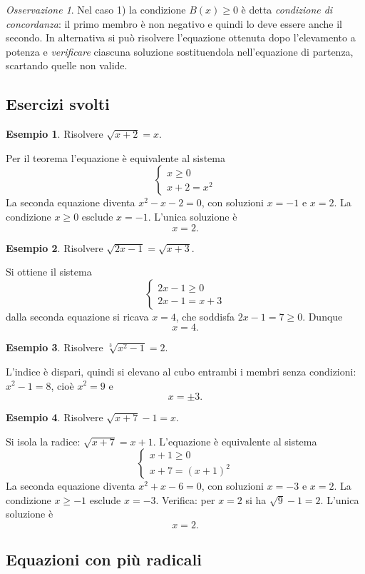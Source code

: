 \documentclass[12pt,a4paper,openany]{book}
\theoremstyle{definition}
\newtheorem{esempio}{Esempio}[section]
\theoremstyle{plain}
\theoremstyle{remark}
\newtheorem*{osservazione}{Osservazione}
\newcommand{\sistema}[1]{\begin{cases}#1\end{cases}}
\begin{document}
\begin{osservazione}
Nel caso 1) la condizione $B(x)\ge 0$ è detta \emph{condizione di concordanza}: il primo membro è non negativo e quindi lo deve essere anche il secondo. In alternativa si può risolvere l'equazione ottenuta dopo l'elevamento a potenza e \emph{verificare} ciascuna soluzione sostituendola nell'equazione di partenza, scartando quelle non valide.
\end{osservazione}

\subsection*{Esercizi svolti}

\begin{esempio}
Risolvere $\sqrt{x+2}=x$.

Per il teorema l'equazione è equivalente al sistema
\[
\sistema{x\ge 0\\ x+2=x^2}
\]
La seconda equazione diventa $x^2-x-2=0$, con soluzioni $x=-1$ e $x=2$. La condizione $x\ge 0$ esclude $x=-1$. L'unica soluzione è
\[
x=2.
\]
\end{esempio}

\begin{esempio}
Risolvere $\sqrt{2x-1}=\sqrt{x+3}$.

Si ottiene il sistema
\[
\sistema{2x-1\ge 0\\ 2x-1=x+3}
\]
dalla seconda equazione si ricava $x=4$, che soddisfa $2x-1=7\ge 0$. Dunque
\[
x=4.
\]
\end{esempio}

\begin{esempio}
Risolvere $\sqrt[3]{x^2-1}=2$.

L'indice è dispari, quindi si elevano al cubo entrambi i membri senza condizioni: $x^2-1=8$, cioè $x^2=9$ e
\[
x=\pm 3.
\]
\end{esempio}

\begin{esempio}
Risolvere $\sqrt{x+7}-1=x$.

Si isola la radice: $\sqrt{x+7}=x+1$. L'equazione è equivalente al sistema
\[
\sistema{x+1\ge 0\\ x+7=(x+1)^2}
\]
La seconda equazione diventa $x^2+x-6=0$, con soluzioni $x=-3$ e $x=2$. La condizione $x\ge -1$ esclude $x=-3$. Verifica: per $x=2$ si ha $\sqrt{9}-1=2$. L'unica soluzione è
\[
x=2.
\]
\end{esempio}

\subsection*{Equazioni con più radicali}
\end{document}
